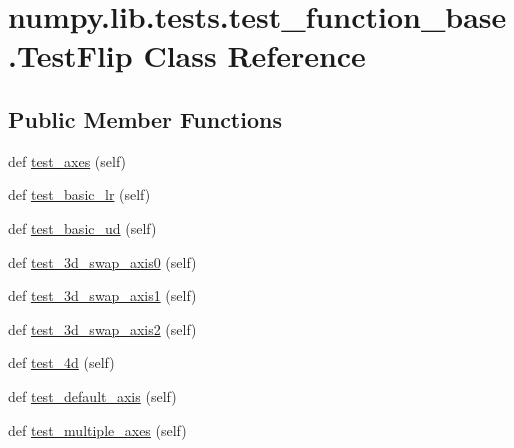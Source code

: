 \hypertarget{classnumpy_1_1lib_1_1tests_1_1test__function__base_1_1TestFlip}{}\section{numpy.\+lib.\+tests.\+test\+\_\+function\+\_\+base.\+Test\+Flip Class Reference}
\label{classnumpy_1_1lib_1_1tests_1_1test__function__base_1_1TestFlip}
\subsection*{Public Member Functions}
\begin{DoxyCompactItemize}
\item 
def \hyperlink{classnumpy_1_1lib_1_1tests_1_1test__function__base_1_1TestFlip_a5dad036d07f157b32552b30b3372f812}{test\+\_\+axes} (self)
\item 
def \hyperlink{classnumpy_1_1lib_1_1tests_1_1test__function__base_1_1TestFlip_afe35da28476fddc21f8794c92f2623db}{test\+\_\+basic\+\_\+lr} (self)
\item 
def \hyperlink{classnumpy_1_1lib_1_1tests_1_1test__function__base_1_1TestFlip_aa1a2e91b7e8e52b6ac805454a341a422}{test\+\_\+basic\+\_\+ud} (self)
\item 
def \hyperlink{classnumpy_1_1lib_1_1tests_1_1test__function__base_1_1TestFlip_a1d5805b65a8446c3ad8b1b7afd5e5846}{test\+\_\+3d\+\_\+swap\+\_\+axis0} (self)
\item 
def \hyperlink{classnumpy_1_1lib_1_1tests_1_1test__function__base_1_1TestFlip_a9f3167f1f6d6eeee210c30c295298986}{test\+\_\+3d\+\_\+swap\+\_\+axis1} (self)
\item 
def \hyperlink{classnumpy_1_1lib_1_1tests_1_1test__function__base_1_1TestFlip_a7a72d6cd4e09c83242e241e4fdbe60a4}{test\+\_\+3d\+\_\+swap\+\_\+axis2} (self)
\item 
def \hyperlink{classnumpy_1_1lib_1_1tests_1_1test__function__base_1_1TestFlip_a062dfc9f838ed20e72df9353080aba28}{test\+\_\+4d} (self)
\item 
def \hyperlink{classnumpy_1_1lib_1_1tests_1_1test__function__base_1_1TestFlip_a3e08789d93e83fef05b11950453ef811}{test\+\_\+default\+\_\+axis} (self)
\item 
def \hyperlink{classnumpy_1_1lib_1_1tests_1_1test__function__base_1_1TestFlip_a42259ff43dc7a3a49683947fb03825a5}{test\+\_\+multiple\+\_\+axes} (self)
\end{DoxyCompactItemize}


